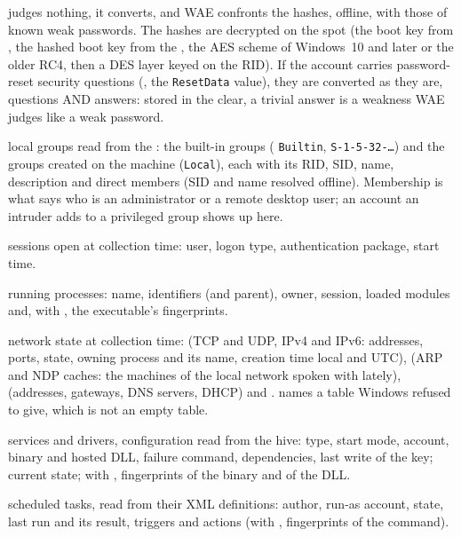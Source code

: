 \documentclass[11pt,a4paper,oneside]{report}
\begin{document}
\begin{description}[style=nextline,leftmargin=1.2em]
{        judges nothing}, it converts, and WAE confronts the hashes, offline, with
        those of known weak passwords. The hashes are decrypted on the spot (the
        boot key from , the hashed boot key from the ,
        the AES scheme of Windows~10 and later or the older RC4, then a DES layer
        keyed on the RID). If the account carries password-reset security
        questions (, the \texttt{ResetData} value), they
        are converted as they are, questions AND answers: stored in the clear, a
        trivial answer is a weakness WAE judges like a weak password.
  \item[\fichier{local\_groups.json}] local groups read from the :
        the built-in groups ( \texttt{Builtin}, \texttt{S-1-5-32-…})
        and the groups created on the machine (\texttt{Local}), each with its RID,
        SID, name, description and direct members (SID and name resolved offline).
        Membership is what says who is an administrator or a remote desktop user;
        an account an intruder adds to a privileged group shows up here.
  \item[\fichier{Sessions.json}] sessions open at collection time: user, logon
        type, authentication package, start time.
  \item[\fichier{processes.json}] running processes: name, identifiers (and
        parent), owner, session, loaded modules and, with , the
        executable's fingerprints.
  \item[\fichier{network.json}] network state at collection time:
         (TCP and UDP, IPv4 and IPv6: addresses, ports,
        state, owning process and its name, creation time local and UTC),
         (ARP and NDP caches: the machines of the local network
        spoken with lately),  (addresses, gateways, DNS
        servers, DHCP) and .  names a table
        Windows refused to give, which is not an empty table.
  \item[\fichier{services.json}] services and drivers, configuration read from
        the hive: type, start mode, account, binary and hosted DLL, failure
        command, dependencies, last write of the key; current state; with
        , fingerprints of the binary and of the DLL.
  \item[\fichier{ScheduledTasks.json}] scheduled tasks, read from their XML
        definitions: author, run-as account, state, last run and its result,
        triggers and actions (with , fingerprints of the command).
\end{description}
\end{document}
